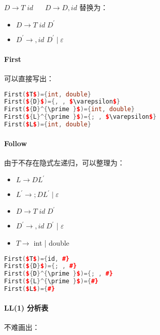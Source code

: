 \(D \rightarrow T \;id\) $\quad$ \(D \rightarrow D,{id}\) 替换为：

\begin{itemize}
    \item $D \rightarrow T\;id\;{D}^{\prime }$
    \item ${D}^{\prime } \rightarrow ,id$ ${D}^{\prime } \mid  \varepsilon$
\end{itemize}

\paragraph{First} 可以直接写出：

\begin{lstlisting}[language=c++,title={First},mathescape]
First($T$)={int, double}
First(${D}$)={, , $\varepsilon$}
First(${D}^{\prime }$)={int, double}
First(${L}^{\prime }$)={; , $\varepsilon$}
First($L$)={int, double}
\end{lstlisting}

\paragraph{Follow} 由于不存在隐式左递归，可以整理为：

\begin{itemize}
    \item $L \rightarrow  D{L}^{\prime }$
    \item ${L}^{\prime } \rightarrow  ;D{L}^{\prime } \mid  \varepsilon$
    \item $D \rightarrow  T\;{id\; D}^{\prime }$
    \item ${D}^{\prime } \rightarrow,id\;{D}^{\prime }$ | ${\varepsilon }$
    \item $T \rightarrow$ int | double
\end{itemize}

\begin{lstlisting}[language=c++,title={Follow},mathescape]
First($T$)={id, #}
First(${D}$)={; , #}
First(${D}^{\prime }$)={; , #}
First(${L}^{\prime }$)={#}
First($L$)={#}
\end{lstlisting}

\paragraph{LL(1) 分析表} 不难画出：



